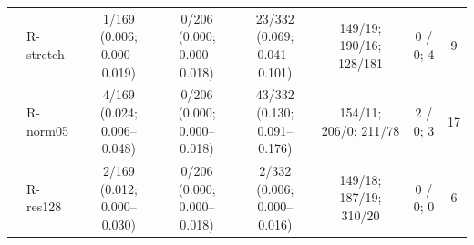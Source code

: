 \begin{longtable}{@{}llcccccc@{}}
 & R-stretch & \makecell{1/169\\{\scriptsize (0.006; 0.000--0.019)}} & \makecell{0/206\\{\scriptsize (0.000; 0.000--0.018)}} & \makecell{23/332\\{\scriptsize (0.069; 0.041--0.101)}} & 149/19; 190/16; 128/181 & 0 / 0; 4 & 9 \\
 & R-norm05 & \makecell{4/169\\{\scriptsize (0.024; 0.006--0.048)}} & \makecell{0/206\\{\scriptsize (0.000; 0.000--0.018)}} & \makecell{43/332\\{\scriptsize (0.130; 0.091--0.176)}} & 154/11; 206/0; 211/78 & 2 / 0; 3 & 17 \\
 & R-res128 & \makecell{2/169\\{\scriptsize (0.012; 0.000--0.030)}} & \makecell{0/206\\{\scriptsize (0.000; 0.000--0.018)}} & \makecell{2/332\\{\scriptsize (0.006; 0.000--0.016)}} & 149/18; 187/19; 310/20 & 0 / 0; 0 & 6 \\
\end{longtable}
